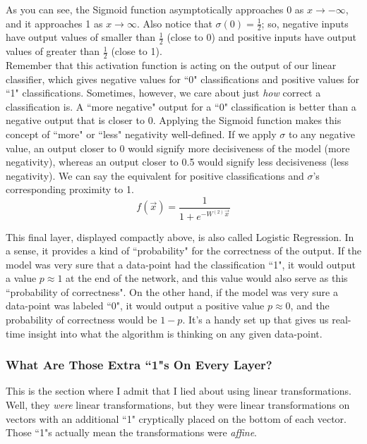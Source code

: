 \documentclass{article}
\begin{document}
As you can see, the Sigmoid function  asymptotically approaches 0 as $x \to -\infty$, and it approaches 1 as $x \to \infty$. Also notice that $\sigma(0) = \frac{1}{2}$; so, negative inputs have output values of smaller than $\frac{1}{2}$ (close to 0) and positive inputs have output values of greater than $\frac{1}{2}$ (close to 1). \\

Remember that this activation function is acting on the output of our linear classifier, which gives negative values for ``0" classifications and positive values for ``1" classifications. Sometimes, however, we care about just \textit{how} correct a classification is. A ``more negative" output for a ``0" classification is better than a negative output that is closer to 0. Applying the Sigmoid function makes this concept of ``more" or ``less" negativity well-defined. If we apply $\sigma$ to any negative value, an output closer to 0 would signify more decisiveness of the model (more negativity), whereas an output closer to 0.5 would signify less decisiveness (less negativity). We can say the equivalent for positive classifications and $\sigma$'s corresponding proximity to 1. \\
\[f\left(\vec{x}\right) = \frac{1}{1 + e^{-W^{(2)}\vec{x}}}\]

This final layer, displayed compactly above, is also called Logistic Regression. In a sense, it provides a kind of ``probability" for the correctness of the output. If the model was very sure that a data-point had the classification ``1", it would output a value $p \approx 1$ at the end of the network, and this value would also serve as this ``probability of correctness". On the other hand, if the model was very sure a data-point was labeled ``0", it would output a positive value $p \approx 0$, and the probability of correctness would be $1- p$. It's a handy set up that gives us real-time insight into what the algorithm is thinking on any given data-point.

\subsubsection{What Are Those Extra ``1"s On Every Layer?}

This is the section where I admit that I lied about using linear transformations. Well, they \textit{were} linear transformations, but they were linear transformations on vectors with an additional ``1" cryptically placed on the bottom of each vector. Those ``1"s actually mean the transformations were \textit{affine}. \\
\end{document}
